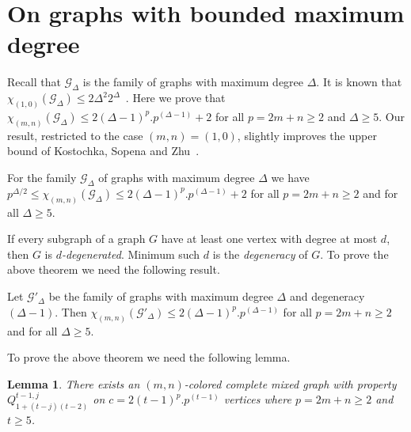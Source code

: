 \documentclass[11pt]{article}
\newtheorem{lemma}[theorem]{Lemma}
\begin{document}
\section{On graphs with bounded maximum degree}
Recall that  $\mathcal{G}_{\Delta}$ is the family of graphs with maximum degree  $\Delta$. 
It is known that $\chi_{(1,0)}(\mathcal{G}_{\Delta}) \leq 2 \Delta^2 2^\Delta$~\cite{Kostochka97acyclicand}. 
Here we prove that $\chi_{(m,n)}(\mathcal{G}_{\Delta}) \leq 2 (\Delta-1)^p .p^{(\Delta-1)} + 2 $ for all $p = 2m+n \geq 2$ and $\Delta \geq 5$. 
Our result, restricted 
to the case $(m,n) = (1,0)$, slightly improves the upper bound of Kostochka, Sopena and Zhu~\cite{Kostochka97acyclicand}.

\begin{theorem}\label{chromatic-degree}
For the family $\mathcal{G}_{\Delta}$  of graphs with maximum degree  
$\Delta$ we have  $p^{\Delta/2} \leq \chi_{(m,n)}(\mathcal{G}_{\Delta}) \leq 2 (\Delta-1)^p. p^{(\Delta-1)} +2$ for all $p = 2m+n \geq 2$ and for all $\Delta \geq 5$.
\end{theorem}

If every subgraph of a graph $G$ have at least one vertex with degree at most $d$, then $G$ is \textit{$d$-degenerated}.  
Minimum such $d$ is the \textit{degeneracy} of $G$. To prove the above theorem we need the following result.

\begin{theorem}\label{chromatic-degree.degeneracy}
Let $\mathcal{G}'_{\Delta}$  be the family of graphs with maximum degree  $\Delta$ and degeneracy $(\Delta - 1)$. Then 
  $\chi_{(m,n)}(\mathcal{G}'_{\Delta}) \leq 2 (\Delta-1)^p .p^{(\Delta-1)}$ for all $p = 2m+n \geq 2$ and for all $\Delta \geq 5$.
\end{theorem}

 
To prove the above theorem we need the following lemma. 

\begin{lemma}\label{key-lemma}
There exists an  $(m,n)$-colored complete mixed graph  with property $Q^{t-1,j}_{1+(t-j)(t-2)}$ on $c = 2 (t-1)^p .p^{(t-1)}$ vertices
where $p = 2m+n \geq 2$ and $t \geq 5$. 
\end{lemma} 
\end{document}
